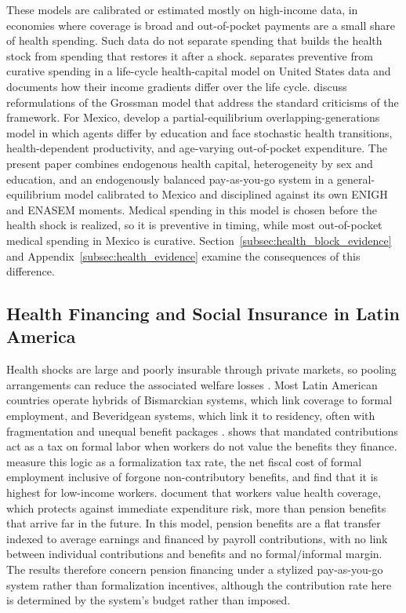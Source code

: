 These models are calibrated or estimated mostly on high-income data, in economies where coverage is broad and out-of-pocket payments are a small share of health spending. Such data do not separate spending that builds the health stock from spending that restores it after a shock. \citet{Ozkan2025} separates preventive from curative spending in a life-cycle health-capital model on United States data and documents how their income gradients differ over the life cycle. \citet{GalamaVanKippersluis2013} discuss reformulations of the Grossman model that address the standard criticisms of the framework. For Mexico, \citet{CortesEtAl2024} develop a partial-equilibrium overlapping-generations model in which agents differ by education and face stochastic health transitions, health-dependent productivity, and age-varying out-of-pocket expenditure. The present paper combines endogenous health capital, heterogeneity by sex and education, and an endogenously balanced pay-as-you-go system in a general-equilibrium model calibrated to Mexico and disciplined against its own ENIGH and ENASEM moments. Medical spending in this model is chosen before the health shock is realized, so it is preventive in timing, while most out-of-pocket medical spending in Mexico is curative. Section~\ref{subsec:health_block_evidence} and Appendix~\ref{subsec:health_evidence} examine the consequences of this difference.

\subsection{Health Financing and Social Insurance in Latin America}
\label{subsec:lit_health}

Health shocks are large and poorly insurable through private markets, so pooling arrangements can reduce the associated welfare losses \citep{Arrow1963}. Most Latin American countries operate hybrids of Bismarckian systems, which link coverage to formal employment, and Beveridgean systems, which link it to residency, often with fragmentation and unequal benefit packages \citep{Levy2008}. \citet{Summers1989} shows that mandated contributions act as a tax on formal labor when workers do not value the benefits they finance. \citet{WorldBankInformalizing2025} measure this logic as a formalization tax rate, the net fiscal cost of formal employment inclusive of forgone non-contributory benefits, and find that it is highest for low-income workers. \citet{BaezaPackard2006} document that workers value health coverage, which protects against immediate expenditure risk, more than pension benefits that arrive far in the future. In this model, pension benefits are a flat transfer indexed to average earnings and financed by payroll contributions, with no link between individual contributions and benefits and no formal/informal margin. The results therefore concern pension financing under a stylized pay-as-you-go system rather than formalization incentives, although the contribution rate here is determined by the system's budget rather than imposed.

